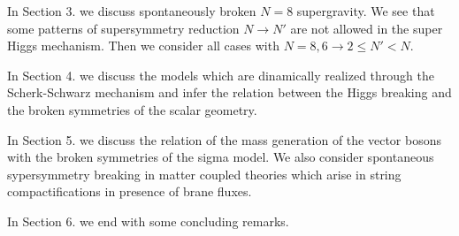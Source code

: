 \documentclass[a4paper,12pt]{article}
\begin{document}
In Section 3. we discuss spontaneously broken $N=8$ supergravity. We see that some patterns of
supersymmetry reduction  $N\rightarrow N'$ are not allowed in the super Higgs mechanism. Then we
consider all cases with $N=8,6\rightarrow 2\leq N'<N$.

In Section 4. we discuss the models which are dinamically realized through the Scherk-Schwarz
mechanism and infer the relation between the Higgs breaking and the broken symmetries of the scalar
geometry.

In Section 5. we discuss the relation of the mass generation of the vector bosons with the broken
 symmetries of the sigma model. We also  consider spontaneous sypersymmetry breaking in matter
  coupled theories which arise in string  compactifications in presence of brane fluxes.

In Section 6. we end with some concluding remarks.
\end{document}
